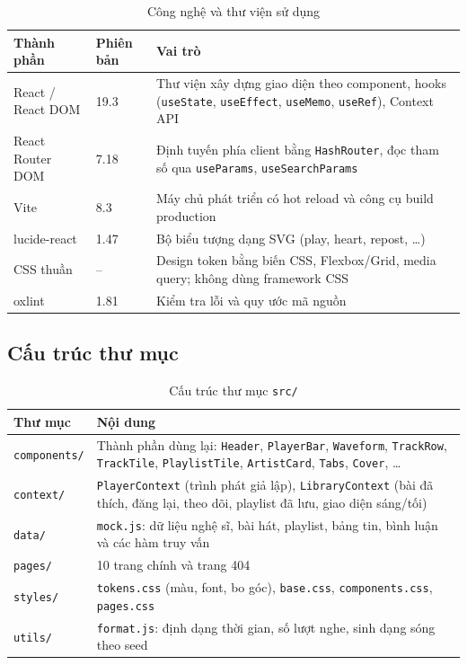 \documentclass[12pt,a4paper]{article}
\begin{document}
\begin{table}[H]
\centering
\small
\begin{tabularx}{\textwidth}{L{3.6cm}C{2cm}Y}
\toprule
\textbf{Thành phần} & \textbf{Phiên bản} & \textbf{Vai trò}\\
\midrule
React / React DOM & 19.3 & Thư viện xây dựng giao diện theo component, hooks (\texttt{useState}, \texttt{useEffect}, \texttt{useMemo}, \texttt{useRef}), Context API\\
React Router DOM & 7.18 & Định tuyến phía client bằng \texttt{HashRouter}, đọc tham số qua \texttt{useParams}, \texttt{useSearchParams}\\
Vite & 8.3 & Máy chủ phát triển có hot reload và công cụ build production\\
lucide-react & 1.47 & Bộ biểu tượng dạng SVG (play, heart, repost, \ldots)\\
CSS thuần & -- & Design token bằng biến CSS, Flexbox/Grid, media query; không dùng framework CSS\\
oxlint & 1.81 & Kiểm tra lỗi và quy ước mã nguồn\\
\bottomrule
\end{tabularx}
\caption{Công nghệ và thư viện sử dụng}
\end{table}
\FloatBarrier

\subsection{Cấu trúc thư mục}

\begin{table}[H]
\centering
\small
\begin{tabularx}{\textwidth}{L{3cm}Y}
\toprule
\textbf{Thư mục} & \textbf{Nội dung}\\
\midrule
\texttt{components/} & Thành phần dùng lại: \texttt{Header}, \texttt{PlayerBar}, \texttt{Waveform}, \texttt{TrackRow}, \texttt{TrackTile}, \texttt{PlaylistTile}, \texttt{ArtistCard}, \texttt{Tabs}, \texttt{Cover}, \ldots\\
\texttt{context/} & \texttt{PlayerContext} (trình phát giả lập), \texttt{LibraryContext} (bài đã thích, đăng lại, theo dõi, playlist đã lưu, giao diện sáng/tối)\\
\texttt{data/} & \texttt{mock.js}: dữ liệu nghệ sĩ, bài hát, playlist, bảng tin, bình luận và các hàm truy vấn\\
\texttt{pages/} & 10 trang chính và trang 404\\
\texttt{styles/} & \texttt{tokens.css} (màu, font, bo góc), \texttt{base.css}, \texttt{components.css}, \texttt{pages.css}\\
\texttt{utils/} & \texttt{format.js}: định dạng thời gian, số lượt nghe, sinh dạng sóng theo seed\\
\bottomrule
\end{tabularx}
\caption{Cấu trúc thư mục \texttt{src/}}
\end{table}
\FloatBarrier
\end{document}
